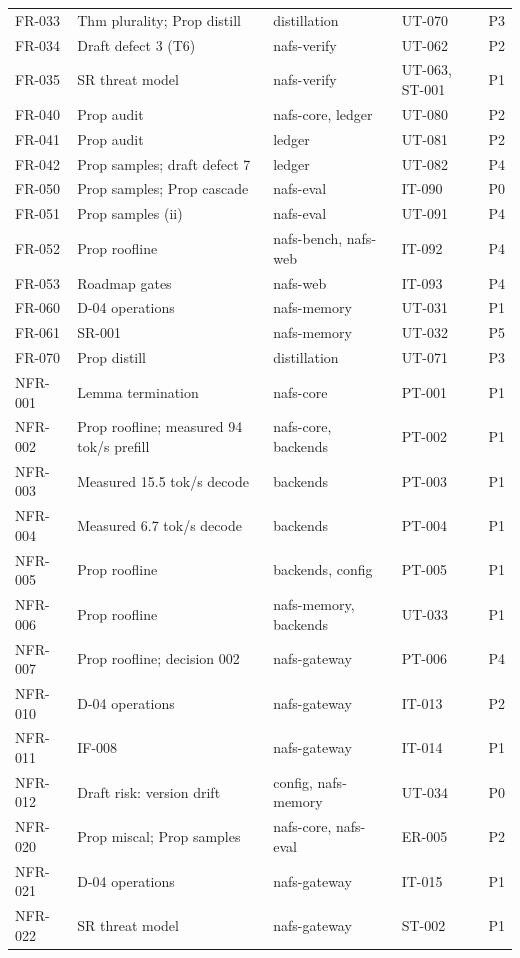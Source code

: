 \begin{longtable}{@{}p{1.45cm}p{4.4cm}p{4.2cm}p{3.1cm}p{1.1cm}@{}}
FR-033 & Thm plurality; Prop distill & distillation & UT-070 & P3\\
FR-034 & Draft defect 3 (T6) & nafs-verify & UT-062 & P2\\
FR-035 & SR threat model & nafs-verify & UT-063, ST-001 & P1\\
FR-040 & Prop audit & nafs-core, ledger & UT-080 & P2\\
FR-041 & Prop audit & ledger & UT-081 & P2\\
FR-042 & Prop samples; draft defect 7 & ledger & UT-082 & P4\\
FR-050 & Prop samples; Prop cascade & nafs-eval & IT-090 & P0\\
FR-051 & Prop samples (ii) & nafs-eval & UT-091 & P4\\
FR-052 & Prop roofline & nafs-bench, nafs-web & IT-092 & P4\\
FR-053 & Roadmap gates & nafs-web & IT-093 & P4\\
FR-060 & D-04 operations & nafs-memory & UT-031 & P1\\
FR-061 & SR-001 & nafs-memory & UT-032 & P5\\
FR-070 & Prop distill & distillation & UT-071 & P3\\
NFR-001 & Lemma termination & nafs-core & PT-001 & P1\\
NFR-002 & Prop roofline; measured 94 tok/s prefill & nafs-core, backends & PT-002 & P1\\
NFR-003 & Measured 15.5 tok/s decode & backends & PT-003 & P1\\
NFR-004 & Measured 6.7 tok/s decode & backends & PT-004 & P1\\
NFR-005 & Prop roofline & backends, config & PT-005 & P1\\
NFR-006 & Prop roofline & nafs-memory, backends & UT-033 & P1\\
NFR-007 & Prop roofline; decision 002 & nafs-gateway & PT-006 & P4\\
NFR-010 & D-04 operations & nafs-gateway & IT-013 & P2\\
NFR-011 & IF-008 & nafs-gateway & IT-014 & P1\\
NFR-012 & Draft risk: version drift & config, nafs-memory & UT-034 & P0\\
NFR-020 & Prop miscal; Prop samples & nafs-core, nafs-eval & ER-005 & P2\\
NFR-021 & D-04 operations & nafs-gateway & IT-015 & P1\\
NFR-022 & SR threat model & nafs-gateway & ST-002 & P1\\

\end{longtable}
